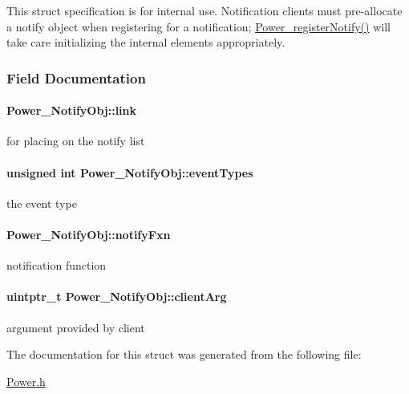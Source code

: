 This struct specification is for internal use. Notification clients must pre-\/allocate a notify object when registering for a notification; \hyperlink{_power_8h_a8e73c431e3d1aab1a31181513ceb8adb}{Power\+\_\+register\+Notify()} will take care initializing the internal elements appropriately. 

\subsubsection{Field Documentation}
\paragraph[{link}]{ Power\+\_\+\+Notify\+Obj\+::link}\label{struct_power___notify_obj_ac29b08d6a225b7bdebc98adc931e3276}
for placing on the notify list 
\paragraph[{event\+Types}]{\setlength{\rightskip}{0pt plus 5cm}unsigned int Power\+\_\+\+Notify\+Obj\+::event\+Types}\label{struct_power___notify_obj_a9ca54b240450f2575f6f70e578c8b988}
the event type 
\paragraph[{notify\+Fxn}]{ Power\+\_\+\+Notify\+Obj\+::notify\+Fxn}\label{struct_power___notify_obj_acfc434bbe72476fdac364ffe7df28f4c}
notification function 
\paragraph[{client\+Arg}]{\setlength{\rightskip}{0pt plus 5cm}uintptr\+\_\+t Power\+\_\+\+Notify\+Obj\+::client\+Arg}\label{struct_power___notify_obj_ab430e61fc76f545d992c452a3bc74405}
argument provided by client 

The documentation for this struct was generated from the following file\+:\begin{DoxyCompactItemize}
\item 
\hyperlink{_power_8h}{Power.\+h}\end{DoxyCompactItemize}
